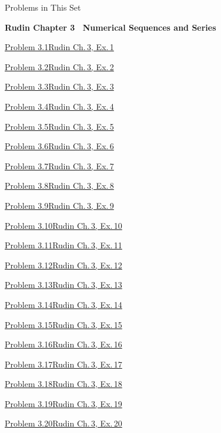 \documentclass[main.tex]{subfiles}
\begin{document}
\hypertarget{hw-3}{}

\begin{lecturecontents}{Problems in This Set}
  \item {\bfseries Rudin Chapter 3 \textendash\ Numerical Sequences and Series}
  \item \hyperlink{prob:3.1}{Problem 3.1\quad Rudin Ch.\,3, Ex.\,1}
  \item \hyperlink{prob:3.2}{Problem 3.2\quad Rudin Ch.\,3, Ex.\,2}
  \item \hyperlink{prob:3.3}{Problem 3.3\quad Rudin Ch.\,3, Ex.\,3}
  \item \hyperlink{prob:3.4}{Problem 3.4\quad Rudin Ch.\,3, Ex.\,4}
  \item \hyperlink{prob:3.5}{Problem 3.5\quad Rudin Ch.\,3, Ex.\,5}
  \item \hyperlink{prob:3.6}{Problem 3.6\quad Rudin Ch.\,3, Ex.\,6}
  \item \hyperlink{prob:3.7}{Problem 3.7\quad Rudin Ch.\,3, Ex.\,7}
  \item \hyperlink{prob:3.8}{Problem 3.8\quad Rudin Ch.\,3, Ex.\,8}
  \item \hyperlink{prob:3.9}{Problem 3.9\quad Rudin Ch.\,3, Ex.\,9}
  \item \hyperlink{prob:3.10}{Problem 3.10\quad Rudin Ch.\,3, Ex.\,10}
  \item \hyperlink{prob:3.11}{Problem 3.11\quad Rudin Ch.\,3, Ex.\,11}
  \item \hyperlink{prob:3.12}{Problem 3.12\quad Rudin Ch.\,3, Ex.\,12}
  \item \hyperlink{prob:3.13}{Problem 3.13\quad Rudin Ch.\,3, Ex.\,13}
  \item \hyperlink{prob:3.14}{Problem 3.14\quad Rudin Ch.\,3, Ex.\,14}
  \item \hyperlink{prob:3.15}{Problem 3.15\quad Rudin Ch.\,3, Ex.\,15}
  \item \hyperlink{prob:3.16}{Problem 3.16\quad Rudin Ch.\,3, Ex.\,16}
  \item \hyperlink{prob:3.17}{Problem 3.17\quad Rudin Ch.\,3, Ex.\,17}
  \item \hyperlink{prob:3.18}{Problem 3.18\quad Rudin Ch.\,3, Ex.\,18}
  \item \hyperlink{prob:3.19}{Problem 3.19\quad Rudin Ch.\,3, Ex.\,19}
  \item \hyperlink{prob:3.20}{Problem 3.20\quad Rudin Ch.\,3, Ex.\,20}

\end{lecturecontents}
\end{document}
